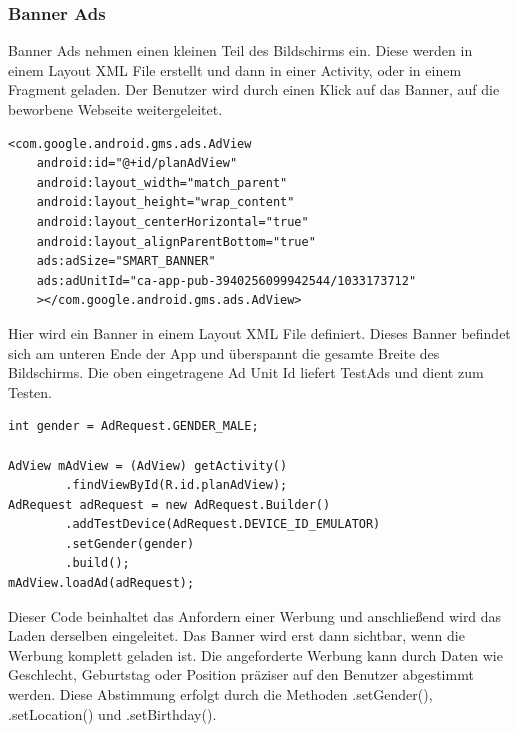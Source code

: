 \documentclass[FIPLY_base.tex]{subfiles}
\begin{document}
\newpage
\subsubsection{Banner Ads}
Banner Ads nehmen einen kleinen Teil des Bildschirms ein. Diese werden in einem Layout XML File erstellt und dann in einer Activity, oder in einem Fragment geladen. 
Der Benutzer wird durch einen Klick auf das Banner, auf die beworbene Webseite weitergeleitet. 
\ \\
\begin{lstlisting}[caption={AdView in einem Layout XML File},label=DescriptiveLabel]
<com.google.android.gms.ads.AdView
    android:id="@+id/planAdView"
    android:layout_width="match_parent"
    android:layout_height="wrap_content"
    android:layout_centerHorizontal="true"
    android:layout_alignParentBottom="true"
    ads:adSize="SMART_BANNER"
    ads:adUnitId="ca-app-pub-3940256099942544/1033173712"
    ></com.google.android.gms.ads.AdView>
\end{lstlisting}
Hier wird ein Banner in einem Layout XML File definiert. Dieses Banner befindet sich am unteren Ende der App und überspannt die gesamte Breite des Bildschirms.
Die oben eingetragene Ad Unit Id liefert TestAds und dient zum Testen.
\ \\
\begin{lstlisting}[caption={Anfordern einer Banner Ad},label=DescriptiveLabel]
int gender = AdRequest.GENDER_MALE;

AdView mAdView = (AdView) getActivity()
        .findViewById(R.id.planAdView);
AdRequest adRequest = new AdRequest.Builder()
        .addTestDevice(AdRequest.DEVICE_ID_EMULATOR)
        .setGender(gender)
        .build();
mAdView.loadAd(adRequest);
\end{lstlisting}
Dieser Code beinhaltet das Anfordern einer Werbung und anschließend wird das Laden derselben eingeleitet.
Das Banner wird erst dann sichtbar, wenn die Werbung komplett geladen ist. 
Die angeforderte Werbung kann durch Daten wie Geschlecht, Geburtstag oder Position präziser auf den Benutzer abgestimmt werden.
Diese Abstimmung erfolgt durch die Methoden .setGender(), .setLocation() und .setBirthday().	

\newpage
\end{document}

